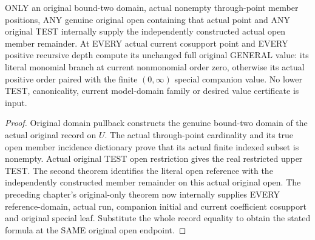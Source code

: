 \begin{theorem}
\label{hir:original-open-member-untested-full-value-formula}
\leanok
ONLY an original bound-two domain, actual nonempty through-point member
positions, ANY genuine original open containing that actual point and ANY
original TEST internally supply the independently constructed actual open
member remainder. At EVERY actual current cosupport point and EVERY positive
recursive depth compute its unchanged full original GENERAL value: its literal
monomial branch at current nonmonomial order zero, otherwise its actual positive
order paired with the finite $(0,\infty)$ special companion value. No lower TEST,
canonicality, current model-domain family or desired value certificate is input.
\end{theorem}
\begin{proof}
Original domain pullback constructs the genuine bound-two domain of the actual
original record on $U$. The actual through-point cardinality and its true open
member incidence dictionary prove that its actual finite indexed subset is
nonempty. Actual original TEST open restriction gives the real restricted
upper TEST. The second theorem identifies the literal open reference with the
independently constructed member remainder on this actual original open.
The preceding chapter's original-only theorem now internally supplies EVERY
reference-domain, actual run, companion initial and current coefficient
cosupport and original special leaf. Substitute the whole record equality to
obtain the stated formula at the SAME original open endpoint.
\end{proof}

